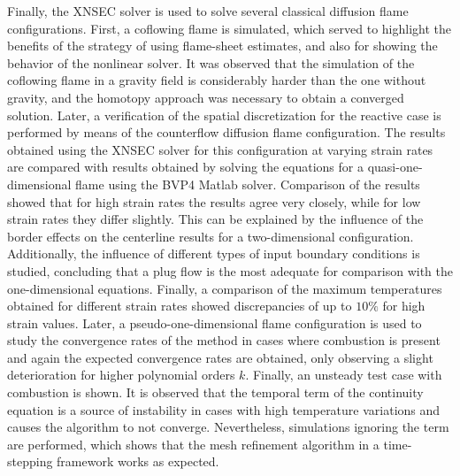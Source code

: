 Finally, the XNSEC solver is used to solve several classical diffusion flame configurations. First, a coflowing flame is simulated, which served to highlight the benefits of the strategy of using flame-sheet estimates, and also for showing the behavior of the nonlinear solver. It was observed that the simulation of the coflowing flame in a gravity field is considerably harder than the one without gravity, and the homotopy approach was necessary to obtain a converged solution. Later, a verification of the spatial discretization for the reactive case is performed by means of the counterflow diffusion flame configuration. The results obtained using the XNSEC solver for this configuration at varying strain rates are compared with results obtained by solving the equations for a quasi-one-dimensional flame using the BVP4 Matlab solver. Comparison of the results showed that for high strain rates the results agree very closely, while for low strain rates they differ slightly. This can be explained by the influence of the border effects on the centerline results for a two-dimensional configuration. Additionally, the influence of different types of input boundary conditions is studied, concluding that a plug flow is the most adequate for comparison with the one-dimensional equations. Finally, a comparison of the maximum temperatures obtained for different strain rates showed discrepancies of up to $10\%$ for high strain values. Later, a pseudo-one-dimensional flame configuration is used to study the convergence rates of the method in cases where combustion is present and again the expected convergence rates are obtained, only observing a slight deterioration for higher polynomial orders $k$. Finally, an unsteady test case with combustion is shown. It is observed that the temporal term of the continuity equation is a source of instability in cases with high temperature variations and causes the algorithm to not converge. Nevertheless, simulations ignoring the term are performed, which shows that the mesh refinement algorithm in a time-stepping framework works as expected.
\FloatBarrier